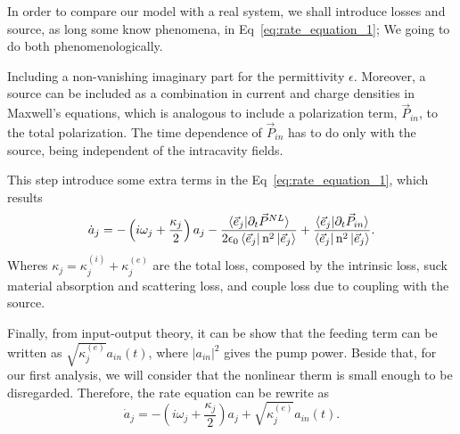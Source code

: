 In order to compare our model with a real system, we shall introduce losses and source, as long some know phenomena, in Eq~\ref{eq:rate_equation_1}; We going to do both phenomenologically.

Including a non-vanishing imaginary part for the permittivity $\epsilon$. Moreover, a source can be included as a combination in current and charge densities in Maxwell's equations, which is analogous to include a polarization term, $\vec{P}_{in}$, to the total polarization. The time dependence of $\vec{P}_{in}$ has to do only with the source, being independent of the intracavity fields.

This step introduce some extra terms in the Eq~\ref{eq:rate_equation_1}, which results
\begin{equation}
    \dot{a}_j = -\left(i\omega_j +\frac{\kappa_j}{2}\right)a_j -\frac{\braket{\vec{e}_j|\partial_t\vec{P}^{NL}}}{2\epsilon_0\bra{\vec{e}_j}\text{n}^2\ket{\vec{e}_j}}+\frac{\braket{\vec{e}_j|\partial_t\vec{P}_{in}}}{\bra{\vec{e}_j}\text{n}^2\ket{\vec{e}_j}}.
\end{equation}
Wheres $\kappa_j = \kappa^{(i)}_j+\kappa^{(e)}_j$ are the total loss, composed by the intrinsic loss, suck material absorption and scattering loss, and couple loss due to coupling with the source. 

Finally, from input-output theory, it can be show that the feeding term can be written as $\sqrt{\kappa^{(e)}_j}a_{in}(t)$, where $|a_{in}|^2$ gives the pump power. Beside that, for our first analysis, we will consider that the nonlinear therm is small enough to be disregarded. Therefore, the rate equation can be rewrite as 
\begin{equation}
    \dot{a}_j = -\left(i\omega_j +\frac{\kappa_j}{2}\right)a_j +\sqrt{\kappa^{(e)}_j}a_{in}(t).
    \label{eq:rate_equation2}
\end{equation} 

